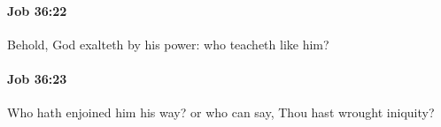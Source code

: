 		\paragraph{Job 36:22} %
			\label{JOB-36-22}

			Behold, God exalteth by his power: who teacheth like him?


		\paragraph{Job 36:23} %
			\label{JOB-36-23}

			Who hath enjoined him his way? or who can say, Thou hast wrought iniquity?


